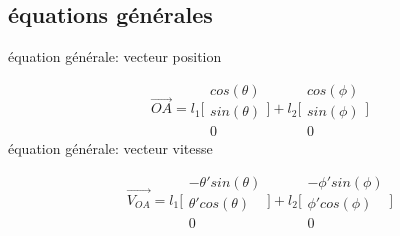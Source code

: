\documentclass{article}
\begin{document}
\subsection{équations générales}
équation générale: vecteur position

\begin{equation}
\overrightarrow{OA} = 
    l_1\Bigg[\begin{array}{cc}
    cos(\theta) \\
    sin(\theta) \\
    0
    \end{array}\Bigg]
    +
    l_2\Bigg[\begin{array}{cc}
    cos(\phi) \\
    sin(\phi) \\
    0
    \end{array}\Bigg]
\end{equation}
équation générale: vecteur vitesse

\begin{equation}
\overrightarrow{V_{OA}} = 
    l_1\Bigg[\begin{array}{cc}
    -\theta'sin(\theta) \\
    \theta'cos(\theta) \\
    0
    \end{array}\Bigg]
    +
    l_2\Bigg[\begin{array}{cc}
    -\phi'sin(\phi) \\
    \phi'cos(\phi) \\
    0
    \end{array}\Bigg]
\end{equation}
\end{document}
